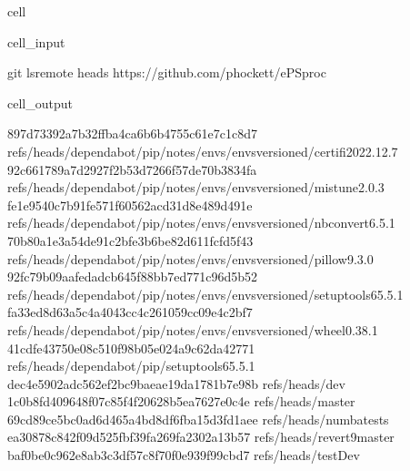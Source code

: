 \documentclass[letterpaper,table,10pt,english]{jupyterBook}
\begin{document}
\begin{sphinxuseclass}{cell}\begin{sphinxVerbatimInput}

\begin{sphinxuseclass}{cell_input}
\begin{sphinxVerbatim}[commandchars=\\\{\}]
git ls\PYGZhy{}remote \PYGZhy{}\PYGZhy{}heads https://github.com/phockett/ePSproc
\end{sphinxVerbatim}

\end{sphinxuseclass}\end{sphinxVerbatimInput}
\begin{sphinxVerbatimOutput}

\begin{sphinxuseclass}{cell_output}
\begin{sphinxVerbatim}[commandchars=\\\{\}]
897d73392a7b32ffba4ca6b6b4755c61e7c1c8d7	refs/heads/dependabot/pip/notes/envs/envs\PYGZhy{}versioned/certifi\PYGZhy{}2022.12.7
92c661789a7d2927f2b53d7266f57de70b3834fa	refs/heads/dependabot/pip/notes/envs/envs\PYGZhy{}versioned/mistune\PYGZhy{}2.0.3
fe1e9540c7b91fe571f60562acd31d8e489d491e	refs/heads/dependabot/pip/notes/envs/envs\PYGZhy{}versioned/nbconvert\PYGZhy{}6.5.1
70b80a1e3a54de91c2bfe3b6be82d611fcfd5f43	refs/heads/dependabot/pip/notes/envs/envs\PYGZhy{}versioned/pillow\PYGZhy{}9.3.0
92fc79b09aafedadcb645f88bb7ed771c96d5b52	refs/heads/dependabot/pip/notes/envs/envs\PYGZhy{}versioned/setuptools\PYGZhy{}65.5.1
fa33ed8d63a5c4a4043cc4c261059cc09e4c2bf7	refs/heads/dependabot/pip/notes/envs/envs\PYGZhy{}versioned/wheel\PYGZhy{}0.38.1
41cdfe43750e08c510f98b05e024a9c62da42771	refs/heads/dependabot/pip/setuptools\PYGZhy{}65.5.1
dec4e5902adc562ef2bc9baeae19da1781b7e98b	refs/heads/dev
1c0b8fd409648f07c85f4f20628b5ea7627e0c4e	refs/heads/master
69cd89ce5bc0ad6d465a4bd8df6fba15d3fd1aee	refs/heads/numba\PYGZhy{}tests
ea30878c842f09d525fbf39fa269fa2302a13b57	refs/heads/revert\PYGZhy{}9\PYGZhy{}master
baf0be0c962e8ab3c3df57c8f70f0e939f99cbd7	refs/heads/testDev
\end{sphinxVerbatim}

\end{sphinxuseclass}\end{sphinxVerbatimOutput}

\end{sphinxuseclass}
\end{document}
